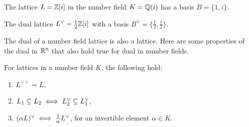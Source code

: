 \documentclass[../main.tex]{subfiles}
\begin{document}
\begin{example}
The lattice $L=\mathbb{Z}[i]$ in the number field $K=\mathbb{Q}(i)$ has a basis $B=\{1,i\}$. 
\iffalse
To find $\dual{L}$, take an element $a+bi \in K$ and solve its trace inner product with the basis  
\begin{align*}
    Tr_{K/\Q}(a+bi) &\in \Z \\
    Tr_{K/\Q}((a+bi)i) &\in \Z.
\end{align*}
Let $\alpha=a+bi$ and $\beta=-b+ai$. By Definition \ref{app def:trcNorm} of trace, we have $[m_{\alpha}] = \begin{pmatrix}
  a & -b\\ 
  b & a
\end{pmatrix}$ and 
$[m_{\beta}] = \begin{pmatrix}
  -b & -a\\ 
  a & -b
\end{pmatrix}$. For both traces to be integers, it entails $2a \in \Z$ and $2b \in \Z$, so 
\fi
The dual lattice $L^{\vee}=\frac{1}{2}\mathbb{Z}[i]$ with a basis $B^{\vee}=\{\frac{1}{2},\frac{i}{2}\}$.
\end{example}

\iffalse

\begin{theorem}
\label{thm:dualBasis}
\reversemarginpar
\marginnote{\textit{$\dual{L}$ is lattice}}
For an $n$-dimensional number field $K$ and a lattice $L$ in $K$ with a $\Z$-basis $\{e_1, \dots, e_n\}$, the dual $L^{\vee}=\bigoplus \Z e_i^{\vee}$ is a lattice with a dual basis  $\{e_1^{\vee}, \dots, e_n^{\vee}\}$ satisfying $Tr_{K/\Q}(e_i e_j^{\vee}) = \delta_{ij}$.\marginpar{what is $\delta_{ij}$}
\end{theorem}
\fi

The dual of a number field lattice is also a lattice.
Here are some properties of the dual in $\mathbb{R}^n$ that also hold true for dual in number fields.

\begin{corollary}
For lattices in a number field $K$, the following hold: 
\begin{enumerate}
    \item $L^{\vee \vee}=L$,
    \item $L_1 \subseteq L_2 \iff L_2^{\vee} \subseteq L_1^{\vee}$,
    \item $(\alpha L)^{\vee} \iff \frac{1}{\alpha}L^{\vee}$, for an invertible element $\alpha \in K$.
\end{enumerate}
\end{corollary}
\end{document}
